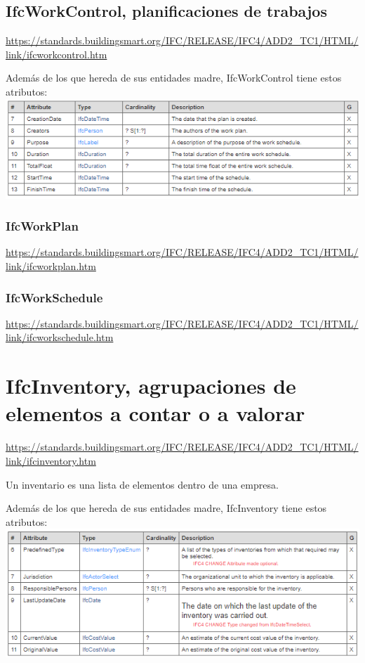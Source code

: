 \documentclass[spanish,12pt,a4paper,final,oneside]{book}
\begin{document}
\subsection{IfcWorkControl, planificaciones de trabajos}
\url{https://standards.buildingsmart.org/IFC/RELEASE/IFC4/ADD2_TC1/HTML/link/ifcworkcontrol.htm}

Además de los que hereda de sus entidades madre, IfcWorkControl tiene estos atributos:
\\ \includegraphics[width=\textwidth]{atributos de IfcWorkControl}

\subsubsection{IfcWorkPlan}
\url{https://standards.buildingsmart.org/IFC/RELEASE/IFC4/ADD2_TC1/HTML/link/ifcworkplan.htm}

\subsubsection{IfcWorkSchedule}
\url{https://standards.buildingsmart.org/IFC/RELEASE/IFC4/ADD2_TC1/HTML/link/ifcworkschedule.htm}


\section{IfcInventory, agrupaciones de elementos a contar o a valorar}
\url{https://standards.buildingsmart.org/IFC/RELEASE/IFC4/ADD2_TC1/HTML/link/ifcinventory.htm}

Un inventario es una lista de elementos dentro de una empresa.

Además de los que hereda de sus entidades madre, IfcInventory tiene estos atributos:
\\ \includegraphics[width=\textwidth]{atributos de IfcInventory}
\end{document}
